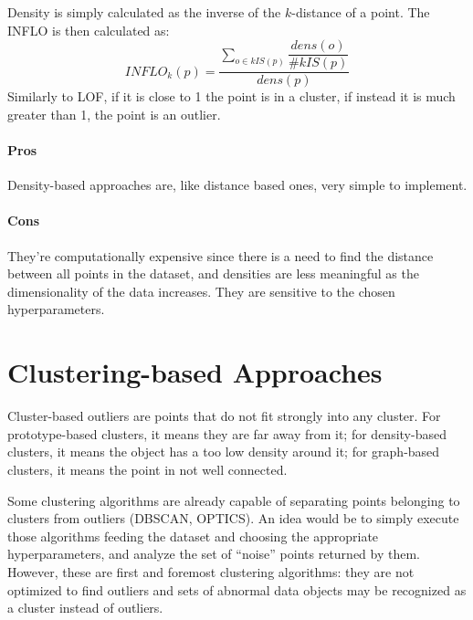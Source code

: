 Density is simply calculated as the inverse of the $k$-distance of a point. The INFLO is then calculated as:\begin{equation*}
    \textit{INFLO}_k(p) = \dfrac{\sum_{o \in kIS(p)} \dfrac{\textit{dens}(o)}{\# kIS(p)}}{dens(p)}
\end{equation*}
Similarly to LOF, if it is close to 1 the point is in a cluster, if instead it is much greater than 1, the point is an outlier.

\paragraph{Pros} Density-based approaches are, like distance based ones, very simple to implement.

\paragraph{Cons} They're computationally expensive since there is a need to find the distance between all points in the dataset, and densities are less meaningful as the dimensionality of the data increases. They are sensitive to the chosen hyperparameters.

\section{Clustering-based Approaches}

Cluster-based outliers are points that do not fit strongly into any cluster. For prototype-based clusters, it means they are far away from it; for density-based clusters, it means the object has a too low density around it; for graph-based clusters, it means the point in not well connected.

Some clustering algorithms are already capable of separating points belonging to clusters from outliers (DBSCAN, OPTICS). An idea would be to simply execute those algorithms feeding the dataset and choosing the appropriate hyperparameters, and analyze the set of ``noise'' points returned by them. However, these are first and foremost clustering algorithms: they are not optimized to find outliers and sets of abnormal data objects may be recognized as a cluster instead of outliers.

